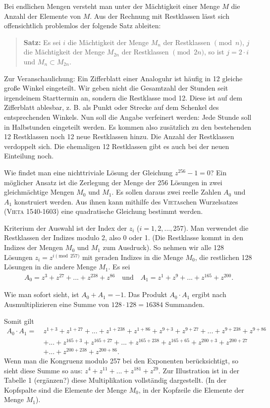 \documentclass[11pt]{article}
\begin{document}
Bei endlichen Mengen versteht man unter der Mächtigkeit einer Menge $M$ die
Anzahl der Elemente von $M$. Aus der Rechnung mit Restklassen lässt sich
offensichtlich problemlos der folgende Satz ableiten:
\begin{quote}
  \textbf{Satz:} Es sei $i$ die Mächtigkeit der Menge $M_n$ der Restklassen
  $\pmod{n}$, $j$ die Mächtigkeit der Menge $M_{2n}$ der Restklassen
  $\pmod{2n}$, so ist $j = 2 \cdot i$ und $M_n \subset M_{2n}$.
\end{quote}
Zur Veranschaulichung: Ein Zifferblatt einer Analoguhr ist häufig in 12
gleiche große Winkel eingeteilt. Wir geben nicht die Gesamtzahl der Stunden
seit irgendeinem Starttermin an, sondern die Restklasse mod 12. Diese ist auf
dem Zifferblatt ablesbar, z. B. als Punkt oder Strecke auf dem Schenkel des
entsprechenden Winkels. Nun soll die Angabe verfeinert werden: Jede Stunde
soll in Halbstunden eingeteilt werden. Es kommen also zusätzlich zu den
bestehenden 12 Restklassen noch 12 neue Restklassen hinzu. Die Anzahl der
Restklassen verdoppelt sich. Die ehemaligen 12 Restklassen gibt es auch bei
der neuen Einteilung noch.

Wie findet man eine nichttriviale Lösung der Gleichung $z^{256} - 1 = 0$?  Ein
möglicher Ansatz ist die Zerlegung der Menge der 256 Lösungen in zwei
gleichmächtige Mengen $M_0$ und $M_1$. Es sollen daraus zwei reelle Zahlen
$A_0$ und $A_1$ konstruiert werden. Aus ihnen kann mithilfe des
\textsc{Vieta}schen Wurzelsatzes (\textsc{Vieta} 1540-1603) eine quadratische
Gleichung bestimmt werden.

Kriterium der Auswahl ist der Index der $z_i$ ($i = 1, 2, ..., 257$). Man
verwendet die Restklassen der Indizes modulo 2, also 0 oder 1. (Die Restklasse
kommt in den Indizes der Mengen $M_0$ und $M_1$ zum Ausdruck). So nehmen wir
alle 128 Lösungen $z_i = z^{i \pmod{257}}$ mit geraden Indizes in die Menge
$M_0$, die restlichen 128 Lösungen in die andere Menge $M_1$. Es sei 
\begin{gather*}
  A_0= z^3 + z^{27} + ... + z^{238} + z^{86}\quad \text{und}\quad A_1 = z^1 +
  z^9 + ... + z^{165} + z^{200}.
\end{gather*}

Wie man sofort sieht, ist $A_0 + A_1 = -1$. Das Produkt $A_0 \cdot A_1$ ergibt
nach Ausmultiplizieren eine Summe von $128 \cdot 128 = 16384$ Summanden.

Somit gilt  
\begin{align*}
  A_0 \cdot A_1 =\ & z^{1 + 3} + z^{1 + 27} + ... + z^{1 + 238} + z^{1 + 86} +
  z^{9 + 3} + z^{9 + 27} + ... + z^{9 + 238} + z^{9 + 86}\\& + ... + z^{165 + 3}
  + z^{165 + 27} + ... + z^{165 + 238} + z^{165 + 65} + z^{200 + 3} + z^{200 +
    27}\\& + ... + z^{200 + 238} + z^{200 + 86}.
\end{align*}
Wenn man die Kongruenz modulo 257 bei den Exponenten berücksichtigt, so sieht
diese Summe so aus: $z^{4} + z^{11} + ... + z^{181} + z^{29}$. Zur
Illustration ist in der Tabelle 1 (ergänzen?) diese Multiplikation vollständig
dargestellt. (In der Kopfspalte sind die Elemente der Menge $M_0$, in der
Kopfzeile die Elemente der Menge $M_1$).
\end{document}
